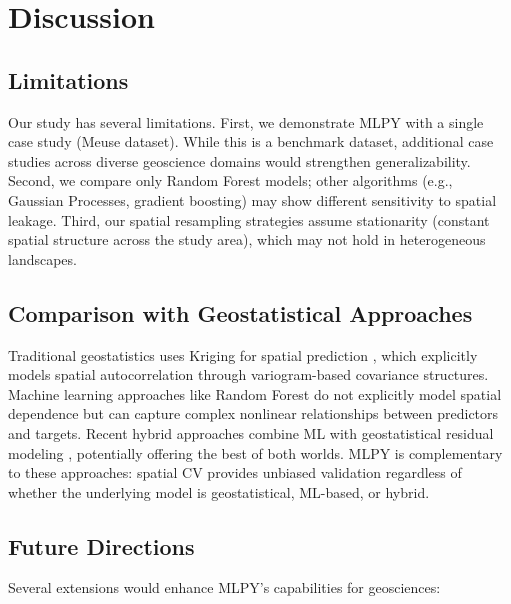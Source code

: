 \documentclass[review,12pt]{elsarticle}
\begin{document}

\section{Discussion}\label{sec:discussion}

\subsection{Limitations}

Our study has several limitations. First, we demonstrate MLPY with a single case study (Meuse dataset). While this is a benchmark dataset, additional case studies across diverse geoscience domains would strengthen generalizability. Second, we compare only Random Forest models; other algorithms (e.g., Gaussian Processes, gradient boosting) may show different sensitivity to spatial leakage. Third, our spatial resampling strategies assume stationarity (constant spatial structure across the study area), which may not hold in heterogeneous landscapes.

\subsection{Comparison with Geostatistical Approaches}

Traditional geostatistics uses Kriging for spatial prediction \citep{cressie1990origins}, which explicitly models spatial autocorrelation through variogram-based covariance structures. Machine learning approaches like Random Forest do not explicitly model spatial dependence but can capture complex nonlinear relationships between predictors and targets. Recent hybrid approaches combine ML with geostatistical residual modeling \citep{hengl2018random}, potentially offering the best of both worlds. MLPY is complementary to these approaches: spatial CV provides unbiased validation regardless of whether the underlying model is geostatistical, ML-based, or hybrid.

\subsection{Future Directions}

Several extensions would enhance MLPY's capabilities for geosciences:
\end{document}
